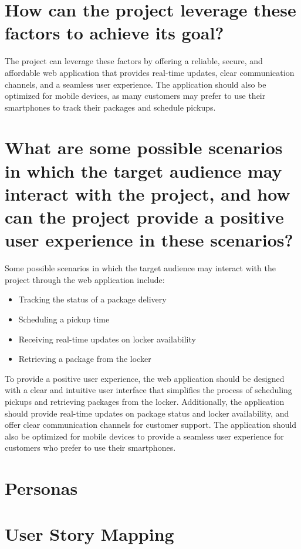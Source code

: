 \documentclass{article}
\begin{document}
\section{How can the project leverage these factors to achieve its goal?}
The project can leverage these factors by offering a reliable, secure, and affordable web application that provides real-time updates, clear communication channels, and a seamless user experience. The application should also be optimized for mobile devices, as many customers may prefer to use their smartphones to track their packages and schedule pickups.

\section{What are some possible scenarios in which the target audience may interact with the project, and how can the project provide a positive user experience in these scenarios?}
Some possible scenarios in which the target audience may interact with the project through the web application include:

\begin{itemize}
    \item Tracking the status of a package delivery
    \item Scheduling a pickup time
    \item Receiving real-time updates on locker availability
    \item Retrieving a package from the locker
\end{itemize}

To provide a positive user experience, the web application should be designed with a clear and intuitive user interface that simplifies the process of scheduling pickups and retrieving packages from the locker. Additionally, the application should provide real-time updates on package status and locker availability, and offer clear communication channels for customer support. The application should also be optimized for mobile devices to provide a seamless user experience for customers who prefer to use their smartphones.

\section{Personas}



\newpage



\newpage 

\section{User Story Mapping}


\end{document}

